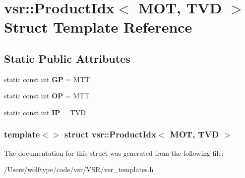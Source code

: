 \hypertarget{structvsr_1_1_product_idx_3_01_m_o_t_00_01_t_v_d_01_4}{\section{vsr\-:\-:Product\-Idx$<$ M\-O\-T, T\-V\-D $>$ Struct Template Reference}
\label{structvsr_1_1_product_idx_3_01_m_o_t_00_01_t_v_d_01_4}
}
\subsection*{Static Public Attributes}
\begin{DoxyCompactItemize}
\item 
\hypertarget{structvsr_1_1_product_idx_3_01_m_o_t_00_01_t_v_d_01_4_aa1bfffd4c3b1eef60bf9d3844fbdfa68}{static const int {\bfseries G\-P} = M\-T\-T}\label{structvsr_1_1_product_idx_3_01_m_o_t_00_01_t_v_d_01_4_aa1bfffd4c3b1eef60bf9d3844fbdfa68}

\item 
\hypertarget{structvsr_1_1_product_idx_3_01_m_o_t_00_01_t_v_d_01_4_a9ce1845c0286336dba687c31c70867a1}{static const int {\bfseries O\-P} = M\-T\-T}\label{structvsr_1_1_product_idx_3_01_m_o_t_00_01_t_v_d_01_4_a9ce1845c0286336dba687c31c70867a1}

\item 
\hypertarget{structvsr_1_1_product_idx_3_01_m_o_t_00_01_t_v_d_01_4_a01c258321f7518f68f7264726f232468}{static const int {\bfseries I\-P} = T\-V\-D}\label{structvsr_1_1_product_idx_3_01_m_o_t_00_01_t_v_d_01_4_a01c258321f7518f68f7264726f232468}

\end{DoxyCompactItemize}
\subsubsection*{template$<$$>$ struct vsr\-::\-Product\-Idx$<$ M\-O\-T, T\-V\-D $>$}



The documentation for this struct was generated from the following file\-:\begin{DoxyCompactItemize}
\item 
/\-Users/wolftype/code/vsr/\-V\-S\-R/vsr\-\_\-templates.\-h\end{DoxyCompactItemize}

